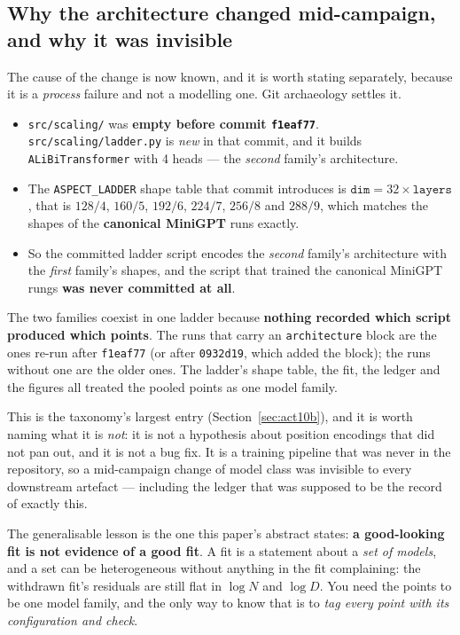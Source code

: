 \documentclass[11pt,a4paper]{article}
\begin{document}
\subsection{Why the architecture changed mid-campaign, and why it was invisible}
\label{sec:act4-cause}

The cause of the change is now known, and it is worth stating separately,
because it is a \emph{process} failure and not a modelling one. Git
archaeology settles it. %

\begin{itemize}
\item \texttt{src/scaling/} was \textbf{empty before commit \texttt{f1eaf77}}.
      \texttt{src/scaling/ladder.py} is \emph{new} in that commit, and it
      builds \texttt{ALiBiTransformer} with 4 heads --- the \emph{second}
      family's architecture.
\item The \texttt{ASPECT\_LADDER} shape table that commit introduces is
      $\texttt{dim} = 32 \times \texttt{layers}$, that is $128/4$, $160/5$,
      $192/6$, $224/7$, $256/8$ and $288/9$, which matches the shapes of the
      \textbf{canonical MiniGPT} runs exactly.
\item So the committed ladder script encodes the \emph{second} family's
      architecture with the \emph{first} family's shapes, and the script that
      trained the canonical MiniGPT rungs \textbf{was never committed at
      all}.
\end{itemize}

The two families coexist in one ladder because \textbf{nothing recorded which
script produced which points}. The runs that carry an \texttt{architecture}
block are the ones re-run after \texttt{f1eaf77} (or after \texttt{0932d19},
which added the block); the runs without one are the older ones. The ladder's
shape table, the fit, the ledger and the figures all treated the pooled points
as one model family. %

This is the taxonomy's largest entry (Section~\ref{sec:act10b}), and it is
worth naming what it is \emph{not}: it is not a hypothesis about position
encodings that did not pan out, and it is not a bug fix. It is a training
pipeline that was never in the repository, so a mid-campaign change of model
class was invisible to every downstream artefact --- including the ledger that
was supposed to be the record of exactly this. %

The generalisable lesson is the one this paper's abstract states:
\textbf{a good-looking fit is not evidence of a good fit}. A fit is a
statement about a \emph{set of models}, and a set can be heterogeneous
without anything in the fit complaining: the withdrawn fit's residuals are
still flat in $\log N$ and $\log D$. You need the points to be one model
family, and the only way to know that is to \emph{tag every point with its
configuration and check}.
\end{document}
